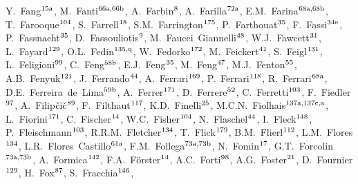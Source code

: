 \begin{flushleft}
Y.~Fang$^\textrm{\scriptsize 15a}$,    
M.~Fanti$^\textrm{\scriptsize 66a,66b}$,    
A.~Farbin$^\textrm{\scriptsize 8}$,    
A.~Farilla$^\textrm{\scriptsize 72a}$,    
E.M.~Farina$^\textrm{\scriptsize 68a,68b}$,    
T.~Farooque$^\textrm{\scriptsize 104}$,    
S.~Farrell$^\textrm{\scriptsize 18}$,    
S.M.~Farrington$^\textrm{\scriptsize 175}$,    
P.~Farthouat$^\textrm{\scriptsize 35}$,    
F.~Fassi$^\textrm{\scriptsize 34e}$,    
P.~Fassnacht$^\textrm{\scriptsize 35}$,    
D.~Fassouliotis$^\textrm{\scriptsize 9}$,    
M.~Faucci~Giannelli$^\textrm{\scriptsize 48}$,    
W.J.~Fawcett$^\textrm{\scriptsize 31}$,    
L.~Fayard$^\textrm{\scriptsize 129}$,    
O.L.~Fedin$^\textrm{\scriptsize 135,q}$,    
W.~Fedorko$^\textrm{\scriptsize 172}$,    
M.~Feickert$^\textrm{\scriptsize 41}$,    
S.~Feigl$^\textrm{\scriptsize 131}$,    
L.~Feligioni$^\textrm{\scriptsize 99}$,    
C.~Feng$^\textrm{\scriptsize 58b}$,    
E.J.~Feng$^\textrm{\scriptsize 35}$,    
M.~Feng$^\textrm{\scriptsize 47}$,    
M.J.~Fenton$^\textrm{\scriptsize 55}$,    
A.B.~Fenyuk$^\textrm{\scriptsize 121}$,    
J.~Ferrando$^\textrm{\scriptsize 44}$,    
A.~Ferrari$^\textrm{\scriptsize 169}$,    
P.~Ferrari$^\textrm{\scriptsize 118}$,    
R.~Ferrari$^\textrm{\scriptsize 68a}$,    
D.E.~Ferreira~de~Lima$^\textrm{\scriptsize 59b}$,    
A.~Ferrer$^\textrm{\scriptsize 171}$,    
D.~Ferrere$^\textrm{\scriptsize 52}$,    
C.~Ferretti$^\textrm{\scriptsize 103}$,    
F.~Fiedler$^\textrm{\scriptsize 97}$,    
A.~Filip\v{c}i\v{c}$^\textrm{\scriptsize 89}$,    
F.~Filthaut$^\textrm{\scriptsize 117}$,    
K.D.~Finelli$^\textrm{\scriptsize 25}$,    
M.C.N.~Fiolhais$^\textrm{\scriptsize 137a,137c,a}$,    
L.~Fiorini$^\textrm{\scriptsize 171}$,    
C.~Fischer$^\textrm{\scriptsize 14}$,    
W.C.~Fisher$^\textrm{\scriptsize 104}$,    
N.~Flaschel$^\textrm{\scriptsize 44}$,    
I.~Fleck$^\textrm{\scriptsize 148}$,    
P.~Fleischmann$^\textrm{\scriptsize 103}$,    
R.R.M.~Fletcher$^\textrm{\scriptsize 134}$,    
T.~Flick$^\textrm{\scriptsize 179}$,    
B.M.~Flierl$^\textrm{\scriptsize 112}$,    
L.M.~Flores$^\textrm{\scriptsize 134}$,    
L.R.~Flores~Castillo$^\textrm{\scriptsize 61a}$,    
F.M.~Follega$^\textrm{\scriptsize 73a,73b}$,    
N.~Fomin$^\textrm{\scriptsize 17}$,    
G.T.~Forcolin$^\textrm{\scriptsize 73a,73b}$,    
A.~Formica$^\textrm{\scriptsize 142}$,    
F.A.~F\"orster$^\textrm{\scriptsize 14}$,    
A.C.~Forti$^\textrm{\scriptsize 98}$,    
A.G.~Foster$^\textrm{\scriptsize 21}$,    
D.~Fournier$^\textrm{\scriptsize 129}$,    
H.~Fox$^\textrm{\scriptsize 87}$,    
S.~Fracchia$^\textrm{\scriptsize 146}$,    

\end{flushleft}
